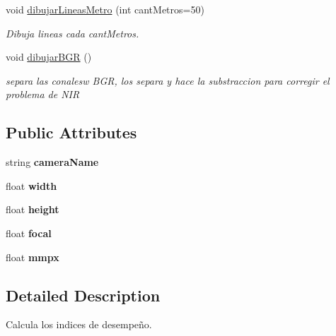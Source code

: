 \begin{DoxyCompactItemize}
\mbox{\label{classUtilInformation_a9bc77ca9f459c05a6e149bacd5b31ceb}} 
void \mbox{\hyperlink{classUtilInformation_a9bc77ca9f459c05a6e149bacd5b31ceb}{dibujar\+Lineas\+Metro}} (int cant\+Metros=50)
\begin{DoxyCompactList}\small\item\em Dibuja lineas cada cant\+Metros. \end{DoxyCompactList}\item 
\mbox{\label{classUtilInformation_ad36a9cb77d1590fc44ede90b2e5818a0}} 
void \mbox{\hyperlink{classUtilInformation_ad36a9cb77d1590fc44ede90b2e5818a0}{dibujar\+B\+GR}} ()
\begin{DoxyCompactList}\small\item\em separa las conalesw B\+GR, los separa y hace la substraccion para corregir el problema de N\+IR \end{DoxyCompactList}\end{DoxyCompactItemize}
\subsection*{Public Attributes}
\begin{DoxyCompactItemize}
\item 
\mbox{\label{classUtilInformation_a10ea8fadab95246ea379b53487781d39}} 
string {\bfseries camera\+Name}
\item 
\mbox{\label{classUtilInformation_aae2e357f15c578cf8321a39bda9daf72}} 
float {\bfseries width}
\item 
\mbox{\label{classUtilInformation_af4760e824ab47a230e2c13ac8b327712}} 
float {\bfseries height}
\item 
\mbox{\label{classUtilInformation_a55f7ab2ca0a2bb4d3ab6af4cd3b9d766}} 
float {\bfseries focal}
\item 
\mbox{\label{classUtilInformation_afdb6d6c41aa2150da6bd8ce842a50d03}} 
float {\bfseries mmpx}
\end{DoxyCompactItemize}


\subsection{Detailed Description}
Calcula los indices de desempeño. 

